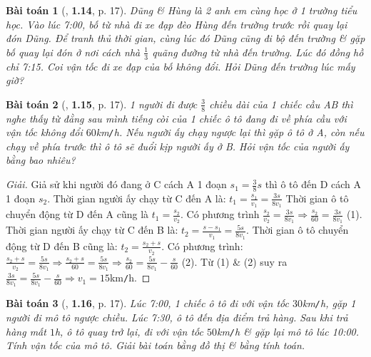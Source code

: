 \documentclass{article}
\numberwithin{equation}{section}
\newtheorem{baitoan}{Bài toán}[section]
\begin{document}
\begin{baitoan}[\cite{Thinh_Lua2021}, \textbf{1.14}, p. 17]
	Dũng \& Hùng là 2 anh em cùng học ở 1 trường tiểu học. Vào lúc 7:00, bố từ nhà đi xe đạp đèo Hùng đến trường trước rồi quay lại đón Dũng. Để tranh thủ thời gian, cùng lúc đó Dũng cũng đi bộ đến trường \& gặp bố quay lại đón ở nơi cách nhà $\frac{1}{3}$ quãng đường từ nhà đến trường. Lúc đó đồng hồ chỉ 7:15. Coi vận tốc đi xe đạp của bố không đổi. Hỏi Dũng đến trường lúc mấy giờ?
\end{baitoan}

\begin{baitoan}[\cite{Thinh_Lua2021}, \textbf{1.15}, p. 17]
	1 người đi được $\frac{3}{8}$ chiều dài của 1 chiếc cầu AB thì nghe thấy từ đằng sau mình tiếng còi của 1 chiếc ô tô đang đi về phía cầu với vận tốc không đổi $60$\emph{km\texttt{/}h}. Nếu người ấy chạy ngược lại thì gặp ô tô ở A, còn nếu chạy về phía trước thì ô tô sẽ đuổi kịp người ấy ở B. Hỏi vận tốc của người ấy bằng bao nhiêu?
\end{baitoan}

\begin{proof}[Giải]
	Giả sử khi người đó đang ở C cách A 1 đoạn $s_1 = \frac{3}{8}s$ thì ô tô đến D cách A 1 đoạn $s_2$. Thời gian người ấy chạy từ C đến A là: $t_1 = \frac{s_1}{v_1} = \frac{3s}{8v_1}$ Thời gian ô tô chuyển động từ D đến A cũng là $t_1 = \frac{s_2}{v_2}$. Có phương trình $\frac{s_2}{v_2} = \frac{3s}{8v_1}\Rightarrow\frac{s_2}{60} = \frac{3s}{8v_1}$ (1). Thời gian người ấy chạy từ C đến B là: $t_2 = \frac{s - s_1}{v_1} = \frac{5s}{8v_1}$. Thời gian ô tô chuyển động từ D đến B cũng là: $t_2 = \frac{s_2 + s}{v_2}$. Có phương trình: $\frac{s_2 + s}{v_2} = \frac{5s}{8v_1}\Rightarrow\frac{s_2 + s}{60} = \frac{5s}{8v_1}\Rightarrow\frac{s_2}{60} = \frac{5s}{8v_1} - \frac{s}{60}$ (2). Từ (1) \& (2) suy ra $\frac{3s}{8v_1} = \frac{5s}{8v_1} - \frac{s}{60}\Rightarrow v_1 = 15$km\texttt{/}h.
\end{proof}

\begin{baitoan}[\cite{Thinh_Lua2021}, \textbf{1.16}, p. 17]
	Lúc 7:00, 1 chiếc ô tô đi với vận tốc $30$\emph{km\texttt{/}h}, gặp 1 người đi mô tô ngược chiều. Lúc 7:30, ô tô đến địa điểm trả hàng. Sau khi trả hàng mất $1$\emph{h}, ô tô quay trở lại, đi với vận tốc $50$\emph{km\texttt{/}h} \& gặp lại mô tô lúc 10:00. Tính vận tốc của mô tô. Giải bài toán bằng đồ thị \& bằng tính toán.
\end{baitoan}


\printbibliography[heading=bibintoc]
	
\end{document}
